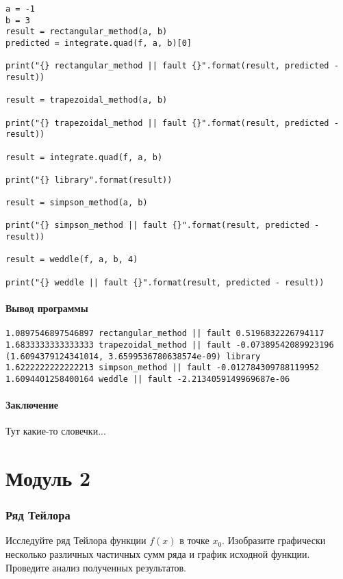\documentclass{article}
\newenvironment{codelisting}{\captionsetup{type=listing}}{}
\begin{document}
\begin{codelisting}
\begin{verbatim}
a = -1
b = 3
result = rectangular_method(a, b)
predicted = integrate.quad(f, a, b)[0]

print("{} rectangular_method || fault {}".format(result, predicted - result))

result = trapezoidal_method(a, b)

print("{} trapezoidal_method || fault {}".format(result, predicted - result))

result = integrate.quad(f, a, b)

print("{} library".format(result))

result = simpson_method(a, b)

print("{} simpson_method || fault {}".format(result, predicted - result))

result = weddle(f, a, b, 4)

print("{} weddle || fault {}".format(result, predicted - result))
\end{verbatim}
\end{codelisting}

\subsubsection*{Вывод программы}

\begin{verbatim}
1.0897546897546897 rectangular_method || fault 0.5196832226794117
1.6833333333333333 trapezoidal_method || fault -0.07389542089923196
(1.6094379124341014, 3.6599536780638574e-09) library
1.6222222222222213 simpson_method || fault -0.012784309788119952
1.6094401258400164 weddle || fault -2.2134059149969687e-06
\end{verbatim}

\subsubsection*{Заключение}

Тут какие-то словечки...

\chapter{Модуль 2}

\subsection{Ряд Тейлора}
Исследуйте ряд Тейлора функции $f(x)$ в точке $x_0$. Изобразите графически несколько различных  частичных сумм ряда и график исходной функции. Проведите анализ полученных результатов.
\end{document}
